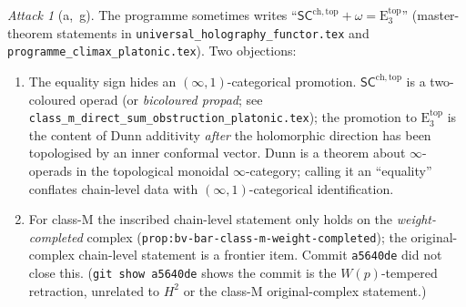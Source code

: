 \documentclass{article}
\theoremstyle{definition}
\theoremstyle{remark}
\newtheorem{attack}[theorem]{Attack}
\newcommand{\SCchtop}{\mathsf{SC}^{\mathrm{ch,top}}}
\newcommand{\Etop}[1]{\mathrm{E}_{#1}^{\mathrm{top}}}
\begin{document}
\begin{attack}[a,~g]
\label{att:cycle1}
The programme sometimes writes
``$\SCchtop + \omega = \Etop{3}$''
(master-theorem statements in
\texttt{universal\_holography\_functor.tex} and
\texttt{programme\_climax\_platonic.tex}). Two objections:
\begin{enumerate}[label=\textup{(\roman*)}]
\item The equality sign hides an $(\infty,1)$-categorical
promotion. $\SCchtop$ is a two-coloured operad (or
\emph{bicoloured propad}; see
\texttt{class\_m\_direct\_sum\_obstruction\_platonic.tex}); the
promotion to $\Etop{3}$ is the content of Dunn additivity
\emph{after} the holomorphic direction has been topologised by
an inner conformal vector. Dunn is a theorem about
$\infty$-operads in the topological monoidal
$\infty$-category; calling it an ``equality'' conflates
chain-level data with $(\infty,1)$-categorical identification.
\item For class-M the inscribed chain-level statement only
holds on the \emph{weight-completed} complex
(\texttt{prop:bv-bar-class-m-weight-completed});
the original-complex chain-level statement is a frontier item.
Commit \texttt{a5640de} did not close this. (\texttt{git show
a5640de} shows the commit is the $W(p)$-tempered retraction,
unrelated to $H^2$ or the class-M original-complex statement.)
\end{enumerate}
\end{attack}
\end{document}
